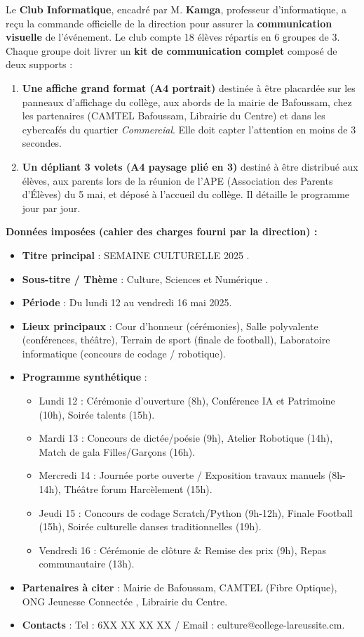 \documentclass[11pt]{article}
\newcommand{\cle}[1]{{\popxbold\color{popdark}#1}}
\begin{document}
Le \textbf{Club Informatique}, encadré par M. \textbf{Kamga}, professeur d'informatique, a reçu la commande officielle de la direction pour assurer la \textbf{communication visuelle} de l'événement. Le club compte 18 élèves répartis en 6 groupes de 3. Chaque groupe doit livrer un \textbf{kit de communication complet} composé de deux supports :

\begin{enumerate}
    \item \textbf{Une affiche grand format (A4 portrait)} destinée à être placardée sur les panneaux d'affichage du collège, aux abords de la mairie de Bafoussam, chez les partenaires (CAMTEL Bafoussam, Librairie du Centre) et dans les cybercafés du quartier \emph{Commercial}. Elle doit capter l'attention en moins de 3 secondes.
    \item \textbf{Un dépliant 3 volets (A4 paysage plié en 3)} destiné à être distribué aux élèves, aux parents lors de la réunion de l'APE (Association des Parents d'Élèves) du 5 mai, et déposé à l'accueil du collège. Il détaille le programme jour par jour.
\end{enumerate}

\textbf{Données imposées (cahier des charges fourni par la direction) :}
\begin{itemize}
    \item \textbf{Titre principal} : \og SEMAINE CULTURELLE 2025 \fg{}.
    \item \textbf{Sous-titre / Thème} : \og Culture, Sciences et Numérique \fg{}.
    \item \textbf{Période} : Du lundi 12 au vendredi 16 mai 2025.
    \item \textbf{Lieux principaux} : Cour d'honneur (cérémonies), Salle polyvalente (conférences, théâtre), Terrain de sport (finale de football), Laboratoire informatique (concours de codage / robotique).
    \item \textbf{Programme synthétique} :
    \begin{itemize}
        \item Lundi 12 : Cérémonie d'ouverture (8h), Conférence \og IA et Patrimoine \fg{} (10h), Soirée talents (15h).
        \item Mardi 13 : Concours de dictée/poésie (9h), Atelier Robotique (14h), Match de gala Filles/Garçons (16h).
        \item Mercredi 14 : Journée porte ouverte / Exposition travaux manuels (8h-14h), Théâtre forum \og Harcèlement \fg{} (15h).
        \item Jeudi 15 : Concours de codage \cle{Scratch}/\cle{Python} (9h-12h), Finale Football (15h), Soirée culturelle danses traditionnelles (19h).
        \item Vendredi 16 : Cérémonie de clôture \& Remise des prix (9h), Repas communautaire (13h).
    \end{itemize}
    \item \textbf{Partenaires à citer} : Mairie de Bafoussam, CAMTEL (Fibre Optique), ONG \og Jeunesse Connectée \fg{}, Librairie du Centre.
    \item \textbf{Contacts} : Tel : 6XX XX XX XX / Email : culture@college-lareussite.cm.
\end{itemize}
\end{document}
